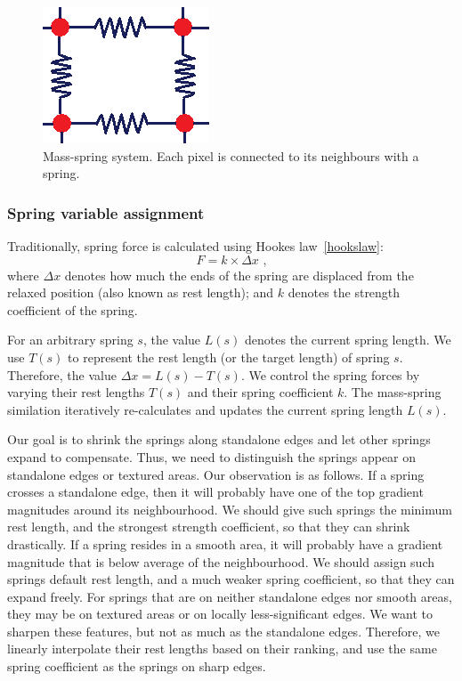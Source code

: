 \begin{figure}[htbp]\centering
\includegraphics{imagesPM/f13.png}
\caption{Mass-spring system. Each pixel is connected to its neighbours with a spring.}
\label{fig:M-Sidea}
\end{figure}

\subsubsection{Spring variable assignment}\label{subsec:springAssignment}
Traditionally, spring force is calculated using Hooke\textquotesingle s law~\eqref{hookslaw}:
\begin{equation}\label {hookslaw}
F = k \times \Delta x \text{ ,}
\end{equation} 
where $\Delta x$ denotes how much the ends of the spring are displaced from the relaxed position (also known as rest length); and $k$ denotes the strength coefficient of the spring. 

For an arbitrary spring $s$, the value $L(s)$ denotes the current spring length. We use $T(s)$ to represent the rest length (or the target length) of spring $s$. Therefore, the value $\Delta x = L(s) - T(s)$.  We control the spring forces by varying their rest lengths $T(s)$ and their spring coefficient $k$. The mass-spring similation iteratively re-calculates and updates the current spring length $L(s)$.

Our goal is to shrink the springs along standalone edges and let other springs expand to compensate. Thus, we need to distinguish the springs appear on standalone edges or textured areas. Our observation is as follows. If a spring crosses a standalone edge, then it will probably have one of the top gradient magnitudes around its neighbourhood. We should give such springs the minimum rest length, and the strongest strength coefficient, so that they can shrink drastically. If a spring resides in a smooth area, it will probably have a gradient magnitude that is below average of the neighbourhood. We should assign such springs default rest length, and a much weaker spring coefficient, so that they can expand freely. For springs that are on neither standalone edges nor smooth areas, they may be on textured areas or on locally less-significant edges. We want to sharpen these features, but not as much as the standalone edges. Therefore, we linearly interpolate their rest lengths based on their ranking, and use the same spring coefficient as the springs on sharp edges. 

